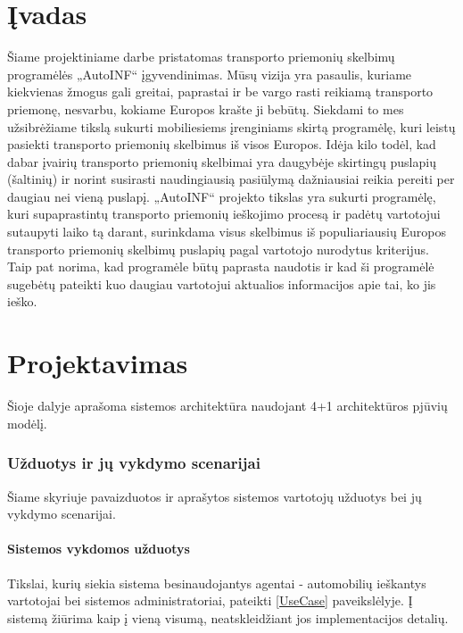 \documentclass[12pt]{article}
\begin{document}
	\part*{Įvadas}
	Šiame projektiniame darbe pristatomas transporto priemonių skelbimų programėlės „AutoINF“ įgyvendinimas. Mūsų vizija yra pasaulis, kuriame kiekvienas žmogus gali greitai, paprastai ir be vargo rasti reikiamą transporto priemonę, nesvarbu, kokiame Europos krašte ji bebūtų. Siekdami to mes užsibrėžiame tikslą sukurti mobiliesiems įrenginiams skirtą programėlę, kuri leistų pasiekti transporto priemonių skelbimus iš visos Europos. Idėja kilo todėl, kad dabar įvairių transporto priemonių skelbimai yra daugybėje skirtingų puslapių (šaltinių) ir norint susirasti naudingiausią pasiūlymą dažniausiai reikia pereiti per daugiau nei vieną puslapį. „AutoINF“ projekto tikslas yra sukurti programėlę, kuri supaprastintų transporto priemonių ieškojimo procesą ir padėtų vartotojui sutaupyti laiko tą darant, surinkdama visus skelbimus iš populiariausių Europos transporto priemonių skelbimų puslapių pagal vartotojo nurodytus kriterijus. Taip pat norima, kad programėle būtų paprasta naudotis ir kad ši programėlė sugebėtų pateikti kuo daugiau vartotojui aktualios informacijos apie tai, ko jis ieško.
	\pagebreak
	
	\part*{Projektavimas}

	Šioje dalyje aprašoma sistemos architektūra naudojant 4+1 architektūros pjūvių modėlį.
	
	\section{Užduotys ir jų vykdymo scenarijai}
	Šiame skyriuje pavaizduotos ir aprašytos sistemos vartotojų užduotys bei jų vykdymo scenarijai.
	\subsection{Sistemos vykdomos užduotys}
 Tikslai, kurių siekia sistema besinaudojantys agentai - automobilių ieškantys vartotojai bei sistemos administratoriai, pateikti \ref{UseCase} paveikslėlyje. Į sistemą žiūrima kaip į vieną visumą, neatskleidžiant jos implementacijos detalių.
	
\end{document}
